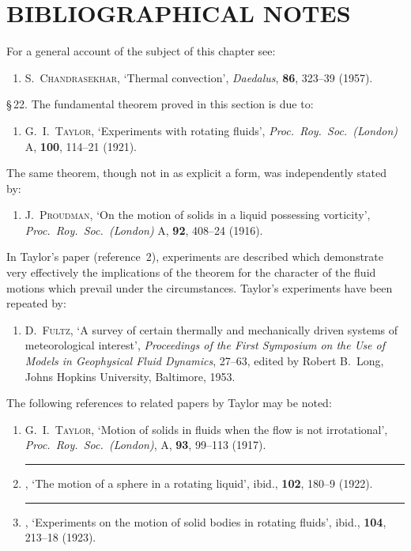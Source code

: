 \section*{BIBLIOGRAPHICAL NOTES}
\label{sec:bib-notes-III}

For a general account of the subject of this chapter see:

\begin{enumerate}
\item[1.] S.\ \textsc{Chandrasekhar}, `Thermal convection', \emph{Daedalus}, \textbf{86}, 323--39 (1957).
\end{enumerate}

\noindent \S\,22.  The fundamental theorem proved in this section is due to:
\begin{enumerate}
\item[2.] G.\ I.\ \textsc{Taylor}, `Experiments with rotating fluids', \emph{Proc.\ Roy.\ Soc.\ (London)}
  A, \textbf{100}, 114--21 (1921).
\end{enumerate}

\noindent The same theorem, though not in as explicit a form, was independently stated by:
\begin{enumerate}
\item[3.] J.\ \textsc{Proudman}, `On the motion of solids in a liquid possessing vorticity',
  \emph{Proc.\ Roy.\ Soc.\ (London)} A, \textbf{92}, 408--24 (1916).
\end{enumerate}

In Taylor's paper (reference~2), experiments are described which demonstrate
very effectively the implications of the theorem for the character of the fluid
motions which prevail under the circumstances.  Taylor's experiments have been
repeated by:
\begin{enumerate}
\item[4.] D.\ \textsc{Fultz}, `A survey of certain thermally and mechanically driven systems
  of meteorological interest', \emph{Proceedings of the First Symposium on the Use
  of Models in Geophysical Fluid Dynamics}, 27--63, edited by Robert B.\ Long,
  Johns Hopkins University, Baltimore, 1953.
\end{enumerate}

\noindent The following references to related papers by Taylor may be noted:
\begin{enumerate}
\item[5.] G.\ I.\ \textsc{Taylor}, `Motion of solids in fluids when the flow is not irrotational',
  \emph{Proc.\ Roy.\ Soc.\ (London)}, A, \textbf{93}, 99--113 (1917).
\item[6.] \rule{2em}{0.4pt}, `The motion of a sphere in a rotating liquid', ibid., \textbf{102}, 180--9
  (1922).
\item[7.] \rule{2em}{0.4pt}, `Experiments on the motion of solid bodies in rotating fluids', ibid.,
  \textbf{104}, 213--18 (1923).
\end{enumerate}

